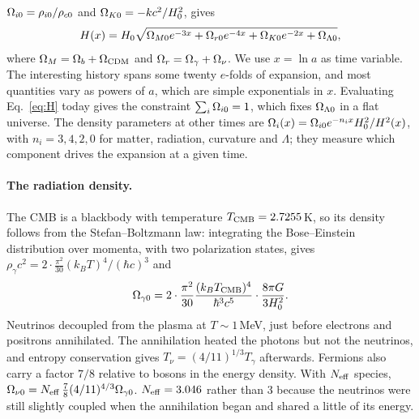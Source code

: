 $\Omega_{i0}=\rho_{i0}/\rho_{c0}$ and $\Omega_{K0}=-kc^2/H_0^2$, gives
\begin{equation}
H(x) = H_0\sqrt{\Omega_{M0}e^{-3x} + \Omega_{r0}e^{-4x} + \Omega_{K0}e^{-2x} + \Omega_{\Lambda0}} ,
\label{eq:H}
\end{equation}
where $\Omega_M=\Omega_b+\Omega_{\rm CDM}$ and $\Omega_r=\Omega_\gamma+\Omega_\nu$. We use $x=\ln a$ as time variable. The interesting
history spans some twenty $e$-folds of expansion, and most quantities vary as powers of $a$, which are simple
exponentials in $x$. Evaluating Eq.~\eqref{eq:H} today gives the constraint $\sum_i\Omega_{i0}=1$, which fixes
$\Omega_{\Lambda0}$ in a flat universe. The density parameters at other times are
$\Omega_i(x)=\Omega_{i0}e^{-n_ix}H_0^2/H^2(x)$, with $n_i=3,4,2,0$ for matter, radiation, curvature and $\Lambda$; they
measure which component drives the expansion at a given time.

\paragraph*{The radiation density.} The CMB is a blackbody with temperature $T_{\rm CMB}=2.7255$\,K, so its density
follows from the Stefan--Boltzmann law: integrating the Bose--Einstein distribution over momenta, with two
polarization states, gives $\rho_\gamma c^2=2\cdot\frac{\pi^2}{30}(k_BT)^4/(\hbar c)^3$ and
\begin{equation}
\Omega_{\gamma0} = 2\cdot\frac{\pi^2}{30}\frac{(k_BT_{\rm CMB})^4}{\hbar^3c^5}\cdot\frac{8\pi G}{3H_0^2}.
\end{equation}
Neutrinos decoupled from the plasma at $T\sim1$\,MeV, just before electrons and positrons annihilated. The annihilation
heated the photons but not the neutrinos, and entropy conservation gives $T_\nu=(4/11)^{1/3}T_\gamma$ afterwards.
Fermions also carry a factor $7/8$ relative to bosons in the energy density. With $N_{\rm eff}$ species,
$\Omega_{\nu0}=N_{\rm eff}\,\tfrac{7}{8}(4/11)^{4/3}\Omega_{\gamma0}$. $N_{\rm eff}=3.046$ rather than 3 because the
neutrinos were still slightly coupled when the annihilation began and shared a little of its energy.


